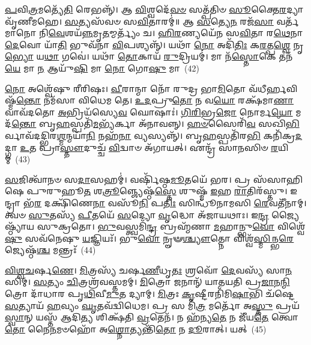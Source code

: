 \-\ul{𑌪}\-𑌵𑌿\-\ul{𑌤𑍍𑌰}\-𑌮𑌤𑍍𑌯𑍇᳴\-\ul{𑌤𑌿} 𑌰𑍇𑌭𑌨𑍍𑌨𑍍᳴। 𑌆 \ul{𑌵𑌿}\-𑌶𑍍𑌵𑌦𑍇᳴\-\ul{𑌵}\-\-\ul{𑍞} 𑌸𑌤𑍍𑌪᳴𑌤𑌿𑍞 \ul{𑌸𑍂}\-𑌕𑍍𑌤𑍈\-\ul{𑌰}\-𑌦𑍍𑌯𑌾 𑌵𑍃᳴𑌣𑍀𑌮𑌹𑍇। \ul{𑌸}\-𑌤𑍍𑌯𑌸᳴𑌵𑍞 𑌸\-\ul{𑌵𑌿}\-𑌤𑌾𑌰𑌮𑍍॑॥ 𑌆 \ul{𑌸}\-𑌤𑍍𑌯𑍇\-\ul{𑌨} 𑌰𑌜᳴\-\ul{𑌸𑌾} 𑌵𑌰𑍍𑌤᳴𑌮𑌾𑌨𑍋 𑌨𑌿\-\ul{𑌵𑍇}\-𑌶𑌯᳴\-\ul{𑌨𑍍𑌨}\-𑌮𑍃\-\ul{𑌤}\-𑌮𑍍𑌮𑌰𑍍𑌤𑍍𑌯𑌂᳴ 𑌚। \ul{𑌹𑌿}\-\-\ul{𑌰}\-𑌣𑍍𑌯𑌯𑍇᳴𑌨 𑌸\-\ul{𑌵𑌿}\-𑌤𑌾 𑌰\-\ul{𑌥𑍇}\-𑌨𑌾 \ul{𑌦𑍇}\-𑌵𑍋 𑌯𑌾᳴\-\ul{𑌤𑌿} 𑌭𑍁𑌵᳴𑌨𑌾 \ul{𑌵𑌿}\-𑌪𑌶𑍍𑌯𑌨𑍍𑌨𑍍᳴। 𑌯𑌥𑌾᳴ \ul{𑌨𑍋} 𑌅𑌦𑌿᳴\-\ul{𑌤𑌿𑌃} 𑌕\-\ul{𑌰}\-𑌤𑍍𑌪\-\ul{𑌶𑍍𑌵𑍇} 𑌨𑍃\-\ul{𑌭𑍍𑌯𑍋} 𑌯\-\ul{𑌥𑌾} 𑌗𑌵𑍇॑। 𑌯𑌥𑌾᳴ \ul{𑌤𑍋}\-𑌕𑌾𑌯᳴ \ul{𑌰𑍁}\-𑌦𑍍𑌰𑌿𑌯𑌮𑍍॑। 𑌮𑌾 𑌨᳴\-\ul{𑌸𑍍𑌤𑍋}\-𑌕𑍇 𑌤𑌨᳴\-\ul{𑌯𑍇} 𑌮𑌾 \ul{𑌨} 𑌆𑌯𑍁᳴\-\ul{𑌷𑌿} 𑌮𑌾 \ul{𑌨𑍋} 𑌗𑍋\-\ul{𑌷𑍁} 𑌮𑌾~(42)

\-\ul{𑌨𑍋} 𑌅𑌶𑍍𑌵𑍇᳴𑌷𑍁 𑌰𑍀𑌰𑌿𑌷𑌃। \ul{𑌵𑍀}\-𑌰𑌾𑌨𑍍𑌮𑌾 𑌨𑍋᳴ 𑌰𑍁𑌦𑍍𑌰 𑌭𑌾\-\ul{𑌮𑌿}\-𑌤𑍋 𑌵᳴𑌧𑍀𑌰𑍍\mbox{}\-\ul{𑌹}\-𑌵𑌿𑌷𑍍𑌮᳴\-\ul{𑌨𑍍𑌤𑍋} 𑌨𑌮᳴𑌸𑌾 𑌵𑌿𑌧𑍇𑌮 𑌤𑍇। \ul{𑌉}\-\-\ul{𑌦}\-𑌪𑍍𑌰𑍁\-\ul{𑌤𑍋} 𑌨 𑌵\-\ul{𑌯𑍋} 𑌰𑌕𑍍𑌷᳴𑌮𑌾\-\ul{𑌣𑌾} 𑌵𑌾𑌵᳴𑌦𑌤𑍋 \ul{𑌅}\-𑌭𑍍𑌰𑌿𑌯᳴𑌸𑍍𑌯𑍇\-\ul{𑌵} 𑌘𑍋𑌷𑌾𑌃॑। \ul{𑌗𑌿}\-\-\ul{𑌰𑌿}\-𑌭𑍍𑌰\-\ul{𑌜𑍋} 𑌨𑍋𑌰𑍍𑌮\-\ul{𑌯𑍋} 𑌮𑌦᳴\-\ul{𑌨𑍍𑌤𑍋} 𑌬𑍃\-\ul{𑌹}\-𑌸𑍍𑌪𑌤𑌿᳴\-\ul{𑌮}\-𑌭𑍍𑌯᳴𑌰𑍍𑌕𑌾 𑌅᳴𑌨𑌾𑌵𑌨𑍍𑌨𑍍। \ul{𑌹}\-\-\ul{𑍞}\-𑌸𑍈𑌰𑌿᳴\-\ul{𑌵} 𑌸𑌖𑌿᳴\-\ul{𑌭𑌿}\-𑌰𑍍𑌵𑌾𑌵᳴𑌦𑌦𑍍𑌭𑌿𑌰\-\ul{𑌶𑍍𑌮}\-𑌨𑍍𑌮𑌯𑌾᳴\-\ul{𑌨𑌿} 𑌨𑌹᳴\-\ul{𑌨𑌾} 𑌵𑍍𑌯𑌸𑍍𑌯𑌨𑍍𑌨𑍍᳴। 𑌬𑍃\-\ul{𑌹}\-𑌸𑍍𑌪𑌤𑌿᳴𑌰\-\ul{𑌭𑌿} 𑌕𑌨𑌿᳴𑌕𑍍𑌰\-\ul{𑌦}\-𑌦𑍍𑌗𑌾 \ul{𑌉}\-𑌤 𑌪𑍍𑌰𑌾\-\ul{𑌸𑍍𑌤𑍗}\-𑌦𑍁𑌚𑍍𑌚᳴ \ul{𑌵𑌿}\-𑌦𑍍𑌵𑌾𑍞 𑌅᳴𑌗𑌾𑌯𑌤𑍍। 𑌏𑌨𑍍𑌦𑍍𑌰᳴ 𑌸𑌾\-\ul{𑌨}\-𑌸𑌿𑍞 \ul{𑌰}\-𑌯𑌿𑌮𑍍~(43)

\-\ul{𑌸}\-𑌜𑌿𑌤𑍍𑌵𑌾᳴𑌨𑍞 𑌸\-\ul{𑌦𑌾}\-𑌸𑌹𑌮𑍍॑। 𑌵𑌰𑍍\mbox{}𑌷𑌿᳴𑌷𑍍𑌠\-\ul{𑌮𑍂}\-𑌤𑌯𑍇᳴ 𑌭𑌰। 𑌪𑍍𑌰 𑌸᳴𑌸𑌾𑌹𑌿𑌷𑍇 𑌪𑍁𑌰𑍁𑌹𑍂\-\ul{𑌤} 𑌶\-\ul{𑌤𑍍𑌰𑍂}\-𑌞𑍍𑌜𑍍𑌯𑍇𑌷𑍍𑌠᳴\-\ul{𑌸𑍍𑌤𑍇} 𑌶𑍁𑌷𑍍𑌮᳴ \ul{𑌇}\-𑌹 \ul{𑌰𑌾}\-𑌤𑌿𑌰᳴𑌸𑍍𑌤𑍁। 𑌇𑌨𑍍𑌦𑍍𑌰𑌾 𑌭᳴\-\ul{𑌰} 𑌦𑌕𑍍𑌷𑌿᳴𑌣𑍇\-\ul{𑌨𑌾} 𑌵𑌸𑍂᳴\-\ul{𑌨𑌿} 𑌪\-\ul{𑌤𑌿𑌃} 𑌸𑌿𑌨𑍍𑌧𑍂᳴𑌨𑌾𑌮𑌸𑌿 \ul{𑌰𑍇}\-𑌵𑌤𑍀᳴𑌨𑌾𑌮𑍍। 𑌤𑍍𑌵𑍞 \ul{𑌸𑍁}\-𑌤𑌸𑍍𑌯᳴ \ul{𑌪𑍀}\-𑌤𑌯𑍇᳴ \ul{𑌸}\-𑌦𑍍𑌯𑍋 \ul{𑌵𑍃}\-𑌦𑍍𑌧𑍋 𑌅᳴𑌜𑌾𑌯𑌥𑌾𑌃। 𑌇\-\ul{𑌨𑍍𑌦𑍍𑌰} 𑌜𑍍𑌯𑍈𑌷𑍍𑌠𑍍𑌯𑌾᳴𑌯 𑌸𑍁𑌕𑍍𑌰𑌤𑍋। \ul{𑌭𑍁}\-𑌵𑌸𑍍𑌤𑍍𑌵𑌮𑌿᳴\-\ul{𑌨𑍍𑌦𑍍𑌰} 𑌬𑍍𑌰𑌹𑍍𑌮᳴𑌣𑌾 \ul{𑌮}\-𑌹𑌾𑌨𑍍𑌭𑍁\-\ul{𑌵𑍋} 𑌵𑌿𑌶𑍍𑌵𑍇᳴\-\ul{𑌷𑍁} 𑌸𑌵᳴𑌨𑍇𑌷𑍁 \ul{𑌯}\-𑌜𑍍𑌞𑌿𑌯𑌃᳴। 𑌭𑍁\-\ul{𑌵𑍋} 𑌨𑍄𑍟\-\ul{𑌶𑍍𑌚𑍍𑌯𑍗}\-𑌤𑍍𑌨𑍋 𑌵𑌿𑌶𑍍𑌵᳴\-\ul{𑌸𑍍𑌮𑌿}\-𑌨𑍍𑌭\-\ul{𑌰𑍇} 𑌜𑍍𑌯𑍇𑌷𑍍𑌠᳴\-\ul{𑌶𑍍𑌚} 𑌮𑌨𑍍𑌤𑍍𑌰𑌃᳴~(44)

\-\ul{𑌵𑌿}\-\-\ul{𑌶𑍍𑌵}\-\-\ul{𑌚}\-𑌰𑍍\mbox{}\-\ul{𑌷}\-\-\ul{𑌣𑍇}\-। \ul{𑌮𑌿}\-𑌤𑍍𑌰𑌸𑍍𑌯᳴ 𑌚𑌰𑍍\mbox{}𑌷\-\ul{𑌣𑍀}\-𑌧𑍃\-\ul{𑌤𑌃} 𑌶𑍍𑌰𑌵𑍋᳴ \ul{𑌦𑍇}\-𑌵𑌸𑍍𑌯᳴ 𑌸𑌾\-\ul{𑌨}\-𑌸𑌿𑌮𑍍। \ul{𑌸}\-𑌤𑍍𑌯𑌂 \ul{𑌚𑌿}\-𑌤𑍍𑌰𑌶𑍍𑌰᳴𑌵𑌸𑍍𑌤𑌮𑌮𑍍। \ul{𑌮𑌿}\-𑌤𑍍𑌰𑍋 𑌜𑌨𑌾𑌨𑍍᳴ 𑌯𑌾𑌤𑌯𑌤𑌿 𑌪𑍍𑌰\-\ul{𑌜𑌾}\-𑌨\-\ul{𑌨𑍍𑌮𑌿}\-𑌤𑍍𑌰𑍋 𑌦𑌾᳴𑌧𑌾𑌰 𑌪𑍃\-\ul{𑌥𑌿}\-𑌵𑍀\-\ul{𑌮𑍁}\-𑌤 𑌦𑍍𑌯𑌾𑌮𑍍। \ul{𑌮𑌿}\-𑌤𑍍𑌰𑌃 \ul{𑌕𑍃}\-𑌷𑍍𑌟𑍀𑌰𑌨𑌿᳴𑌮𑌿\-\ul{𑌷𑌾}\-𑌭𑌿 𑌚᳴𑌷𑍍𑌟𑍇 \ul{𑌸}\-𑌤𑍍𑌯𑌾𑌯᳴ \ul{𑌹}\-𑌵𑍍𑌯𑌂 \ul{𑌘𑍃}\-𑌤𑌵᳴𑌦𑍍𑌵𑌿𑌧𑍇𑌮। 𑌪𑍍𑌰 𑌸 𑌮𑌿᳴\-\ul{𑌤𑍍𑌰} 𑌮𑌰𑍍𑌤𑍋᳴ 𑌅\-\ul{𑌸𑍍𑌤𑍁} 𑌪𑍍𑌰𑌯᳴\-\ul{𑌸𑍍𑌵𑌾}\-𑌨𑍍 𑌯𑌸𑍍𑌤᳴ 𑌆𑌦𑌿\-\ul{𑌤𑍍𑌯} 𑌶𑌿𑌕𑍍𑌷᳴𑌤𑌿 \ul{𑌵𑍍𑌰}\-𑌤𑍇𑌨᳴। 𑌨 𑌹᳴𑌨𑍍𑌯\-\ul{𑌤𑍇} 𑌨 𑌜𑍀᳴𑌯\-\ul{𑌤𑍇} 𑌤𑍍𑌵𑍋\-\ul{𑌤𑍋} 𑌨𑍈\-\ul{𑌨}\-𑌮𑍞𑌹𑍋᳴ 𑌅\-\ul{𑌶𑍍𑌨𑍋}\-𑌤𑍍𑌯𑌨𑍍𑌤𑌿᳴\-\ul{𑌤𑍋} 𑌨 \ul{𑌦𑍂}\-𑌰𑌾𑌤𑍍। 𑌯𑌤𑍍~(45)


